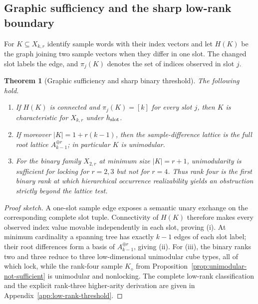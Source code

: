 \documentclass[11pt]{article}
\newtheorem{theorem}[definition]{Theorem}
\begin{document}
\subsection{Graphic sufficiency and the sharp low-rank boundary}
\label{subsec:exchange-threshold-main}

For $K\subseteq X_{k,r}$ identify sample words with their index vectors and
let $H(K)$ be the graph joining two sample vectors when they differ in one
slot.  The changed slot labels the edge, and $\pi_j(K)$ denotes the set of
indices observed in slot $j$.

\begin{theorem}[Graphic sufficiency and sharp binary threshold]
\label{thm:graphic-sharp-package}
The following hold.
\begin{enumerate}[label=\textup{(\roman*)},leftmargin=*]
\item If $H(K)$ is connected and $\pi_j(K)=[k]$ for every slot $j$, then
$K$ is characteristic for $X_{k,r}$ under $h_{\rm slot}$.
\item If moreover $|K|=1+r(k-1)$, then the sample-difference lattice is the
full root lattice $A_{k-1}^{\oplus r}$; in particular $K$ is unimodular.
\item For the binary family $X_{2,r}$ at minimum size $|K|=r+1$,
unimodularity is sufficient for locking for $r=2,3$ but not for $r=4$.
Thus rank four is the first binary rank at which hierarchical occurrence
realizability yields an obstruction strictly beyond the lattice test.
\end{enumerate}
\end{theorem}

\begin{proof}[Proof sketch]
A one-slot sample edge exposes a semantic unary exchange on the corresponding
complete slot tuple.  Connectivity of $H(K)$ therefore makes every observed
index value movable independently in each slot, proving \textup{(i)}.
At minimum cardinality a spanning tree has exactly $k-1$ edges of each slot
label; their root differences form a basis of $A_{k-1}^{\oplus r}$, giving
\textup{(ii)}.  For \textup{(iii)}, the binary ranks two and three reduce to
three low-dimensional unimodular cube types, all of which lock, while the
rank-four sample $K_{\diamond}$ from
Proposition~\ref{prop:unimodular-not-sufficient} is unimodular and nonlocking.
The complete low-rank classification and the explicit rank-three higher-arity
derivation are given in Appendix~\ref{app:low-rank-threshold}.
\end{proof}
\end{document}
